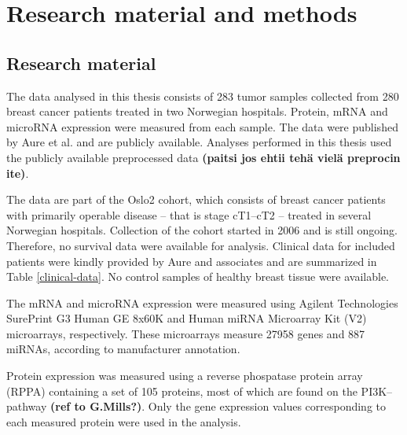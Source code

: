 


\section{Research material and methods}\label{material-and-methods}

\subsection{Research material}

The data analysed in this thesis consists of 283 tumor samples collected from
280 breast cancer patients treated in two Norwegian hospitals. Protein, mRNA
and microRNA expression were measured from each sample. The data were
published by Aure et al. \citep{Aure2015} and are publicly available. Analyses
performed in this thesis used the publicly available preprocessed data
\textbf{(paitsi jos ehtii tehä vielä preprocin ite)}.

The data are part of the Oslo2 cohort, which consists of breast cancer
patients with primarily operable disease -- that is stage cT1--cT2 -- treated
in several Norwegian hospitals. Collection of the cohort started in 2006 and
is still ongoing. Therefore, no survival data were available for analysis.
Clinical data for included patients were kindly provided by Aure and
associates and are summarized in Table \ref{clinical-data}. No control samples
of healthy breast tissue were available.



The mRNA and microRNA expression were measured using Agilent Technologies
SurePrint G3 Human GE 8x60K and Human miRNA Microarray Kit (V2) microarrays,
respectively. These microarrays measure 27958 genes and 887 miRNAs, according to
manufacturer annotation.

Protein expression was measured using a reverse phospatase protein array
(RPPA) containing a set of 105 proteins, most of which are found on the PI3K--
pathway \textbf{(ref to G.Mills?)}. Only the gene expression values
corresponding to each measured protein were used in the analysis.






